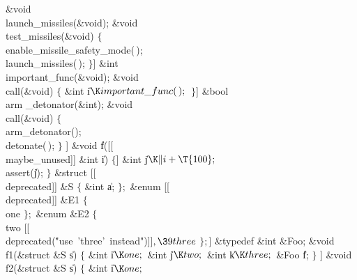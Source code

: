 \&{void} \\{launch\_missiles}(\&{void});\7
\1\1\&{void} \\{test\_missiles}(\&{void})\2\2\6
${}\{{}$\1\6
\\{enable\_missile\_safety\_mode}(\,);\6
\\{launch\_missiles}(\,);\6
\4${}\}{}$\2\7
[[\\{nodiscard}]] \&{int} \\{important\_func}(\&{void});\7
\1\1\&{void} \\{call}(\&{void})\2\2\6
${}\{{}$\1\6
\&{int} \|i${}\K\\{important\_func}(\,);{}$\6
\4${}\}{}$\2\7
[[\\{nodiscard}(\.{"must\ check\ armed\ st}\)\.{ate"})]] \&{bool} \\{arm%
\_detonator}(\&{int});\7
\1\1\&{void} \\{call}(\&{void})\2\2\6
${}\{{}$\1\6
\\{arm\_detonator}();\6
\\{detonate}(\,);\6
\4${}\}{}$\2\7
\1\1[[\\{maybe\_unused}]] \&{void} \|f([[\\{maybe\_unused}]] \&{int} \|i)\2\2\6
${}\{{}$\1\6
[[\\{maybe\_unused}]] \&{int} \|j${}\K\|i+\T{100};{}$\7
\\{assert}(\|j);\6
\4${}\}{}$\2\7
\&{struct} [[\\{deprecated}]] \&S ${}\{{}$\1\6
\&{int} \|a;\2\6
${}\};{}$\6
\&{enum} [[\\{deprecated}]] \&{E1} ${}\{{}$\1\6
\\{one}\2\6
${}\};{}$\6
\&{enum} \&{E2} ${}\{{}$\1\6
\\{two} [[\\{deprecated}(\.{"use\ ’three’\ ins}\)\.{tead"})]]${},\39%
\\{three}{}$\2\6
${}\};{}$\6
[[\\{deprecated}]] \&{typedef} \&{int} \&{Foo};\7
\1\1\&{void} \\{f1}(\&{struct} \&S \|s)\2\2\6
${}\{{}$\1\6
\&{int} \|i${}\K\\{one};{}$\6
\&{int} \|j${}\K\\{two};{}$\6
\&{int} \|k${}\K\\{three};{}$\6
\&{Foo} \|f;\6
\4${}\}{}$\2\7
\1\1[[\\{deprecated}]] \&{void} \\{f2}(\&{struct} \&S \|s)\2\2\6
${}\{{}$\1\6
\&{int} \|i${}\K\\{one};{}$\6
